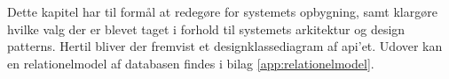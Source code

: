Dette kapitel har til formål at redegøre for systemets opbygning, samt klargøre hvilke valg 
der er blevet taget i forhold til systemets arkitektur og design patterns. Hertil bliver der fremvist et 
designklassediagram af api'et. Udover kan en relationelmodel af databasen findes i bilag \ref{app:relationelmodel}.